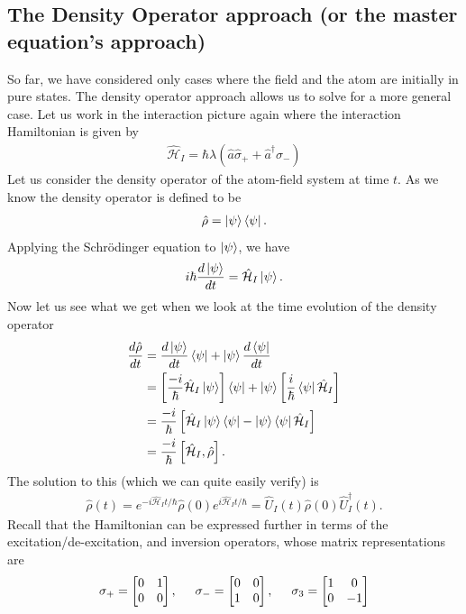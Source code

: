 \documentclass{book}
\theoremstyle{definition}
\newcommand{\ham}{\mathcal{H}}
\newcommand{\f}[2]{\frac{#1}{#2}}
\newcommand{\lp}{\left(}
\newcommand{\rp}{\right)}
\newcommand{\lb}{\left[}
\newcommand{\rb}{\right]}
\begin{document}
\subsection{The Density Operator approach (or the master equation's approach) }
So far, we have considered only cases where the field and the atom are initially in pure states. The density operator approach allows us to solve for a more general case. Let us work in the interaction picture again where the interaction Hamiltonian is given by
\begin{align}
\hat{\ham}_I = \hbar\lambda \lp \hat{a}\hat{\sigma}_+ + \hat{a}^\dagger\hat{\sigma}_- \rp
\end{align}
Let us consider the density operator of the atom-field system at time $t$. As we know the density operator is defined to be
\begin{align}
\hat{\rho} = \ket{\psi}\bra{\psi}.
\end{align}
Applying the Schr\"{o}dinger equation to $\ket{\psi}$, we have
\begin{align}
i\hbar \f{d\ket{\psi}}{dt} = \hat{\ham}_I \ket{\psi}.
\end{align}
Now let us see what we get when we look at the time evolution of the density operator
\begin{align}
\f{d \hat{\rho}}{dt} &= \f{d\ket{\psi}}{dt} \bra{\psi} + \ket{\psi}\f{d\bra{\psi}}{dt}\\
&= \lb \f{-i}{\hbar}\hat{\ham}_I\ket{\psi} \rb\bra{\psi} + \ket{\psi}\lb \f{i}{\hbar}\bra{\psi} \hat{\ham}_I \rb\\
&= \f{-i}{\hbar}\lb \hat{\ham}_I\ket{\psi}\bra{\psi} - \ket{\psi}\bra{\psi}\hat{\ham}_I \rb\\
&= \f{-i}{\hbar}\lb \hat{\ham}_I, \hat{\rho} \rb.
\end{align}
The solution to this (which we can quite easily verify) is 
\begin{align}\label{rho}
\hat{\rho}(t) = e^{-i\hat{\ham}_I t/\hbar}\hat{\rho}(0)e^{i\hat{\ham}_I t/\hbar} = \hat{U}_I(t)\hat{\rho}(0)\hat{U}_I^\dagger(t).
\end{align} 
Recall that the Hamiltonian can be expressed further in terms of the excitation/de-excitation, and inversion operators, whose matrix representations are
\begin{align}
\sigma_+ = \begin{bmatrix}
0 & 1\\0 & 0
\end{bmatrix}, \hspace{0.5cm}
\sigma_- = \begin{bmatrix}
0 & 0 \\ 1 & 0
\end{bmatrix}, \hspace{0.5cm}
\sigma_3 = \begin{bmatrix}
1 & 0 \\ 0 & -1
\end{bmatrix}
\end{align}
\end{document}
